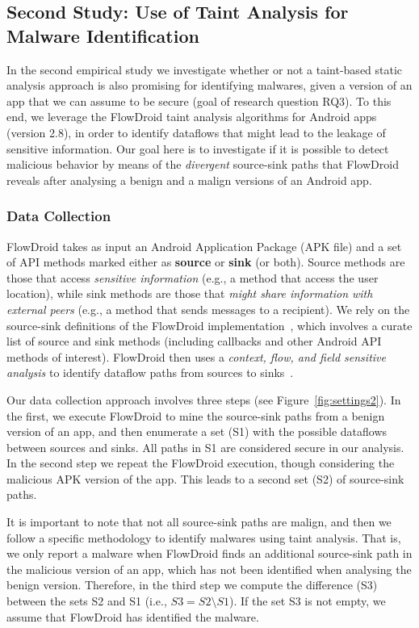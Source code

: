 \subsection{Second Study: Use of Taint Analysis for Malware Identification}\label{sec:set2}

In the second empirical study 
we investigate whether or not a taint-based static analysis approach is also promising for
identifying malwares, given a version of an app that we can assume to be secure (goal of research
question RQ3).
To this end, we leverage the FlowDroid
taint analysis algorithms for Android apps (version 2.8), in order to identify dataflows
that might lead to the leakage of sensitive information. Our
goal here is to investigate if it is possible to detect malicious
behavior by means of the \emph{divergent} source-sink paths that FlowDroid reveals after
analysing a benign and a malign versions of an Android app.

\subsubsection{Data Collection}

FlowDroid takes as input an Android Application Package (APK file) and
a set of API methods marked either as {\bf source}
or {\bf sink} (or both). Source methods are those that access \emph{sensitive information} (e.g.,
a method that access the user location), while sink methods are those 
that \emph{might share information with external peers} (e.g., a method that
sends messages to a recipient). We rely on the source-sink definitions
of the FlowDroid implementation~\cite{arzt:pldi-2014,rasthofer-source-sink},
which involves a curate list of source and sink methods (including callbacks and
other Android API methods of interest).
FlowDroid then uses a \emph{context, flow, and field
sensitive analysis} to identify dataflow paths from sources to sinks~\cite{arzt:pldi-2014}.

Our data collection approach involves three steps (see Figure~\ref{fig:settings2}). In the first, we execute FlowDroid to mine the source-sink paths from a benign version of an app, and then enumerate a set (S1) with the 
possible dataflows between sources and sinks. All paths in S1 are considered secure
in our analysis. In the second step we repeat the FlowDroid execution, though
considering the malicious APK version of the app.
This leads to a second set (S2) of source-sink paths.

It is important to note that not all source-sink paths are malign, and then we
follow a specific methodology to identify malwares using taint analysis. That is,
we only report a malware when
FlowDroid finds an additional source-sink path in the malicious version of an app, which
has not been identified when analysing the benign version. Therefore, in the third step we compute the difference (S3) between the sets S2 and S1 (i.e., $S3 = S2 \setminus S1$). If the set S3 is not empty, we assume that FlowDroid
has identified the malware.

